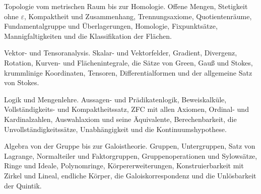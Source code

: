 \begin{merksatz}
Topologie vom metrischen Raum bis zur Homologie. Offene Mengen, Stetigkeit ohne $\varepsilon$, Kompaktheit und Zusammenhang, Trennungsaxiome, Quotientenräume, Fundamentalgruppe und Überlagerungen, Homologie, Fixpunktsätze, Mannigfaltigkeiten und die Klassifikation der Flächen.

\end{merksatz}

\begin{merksatz}
Vektor- und Tensoranalysis. Skalar- und Vektorfelder, Gradient, Divergenz, Rotation, Kurven- und Flächenintegrale, die Sätze von Green, Gauß und Stokes, krummlinige Koordinaten, Tensoren, Differentialformen und der allgemeine Satz von Stokes.

\end{merksatz}

\begin{merksatz}
Logik und Mengenlehre. Aussagen- und Prädikatenlogik, Beweiskalküle, Vollständigkeits- und Kompaktheitssatz, ZFC mit allen Axiomen, Ordinal- und Kardinalzahlen, Auswahlaxiom und seine Äquivalente, Berechenbarkeit, die Unvollständigkeitssätze, Unabhängigkeit und die Kontinuumshypothese.

\end{merksatz}

\begin{merksatz}
Algebra von der Gruppe bis zur Galoistheorie. Gruppen, Untergruppen, Satz von Lagrange, Normalteiler und Faktorgruppen, Gruppenoperationen und Sylowsätze, Ringe und Ideale, Polynomringe, Körpererweiterungen, Konstruierbarkeit mit Zirkel und Lineal, endliche Körper, die Galoiskorrespondenz und die Unlösbarkeit der Quintik.

\end{merksatz}

